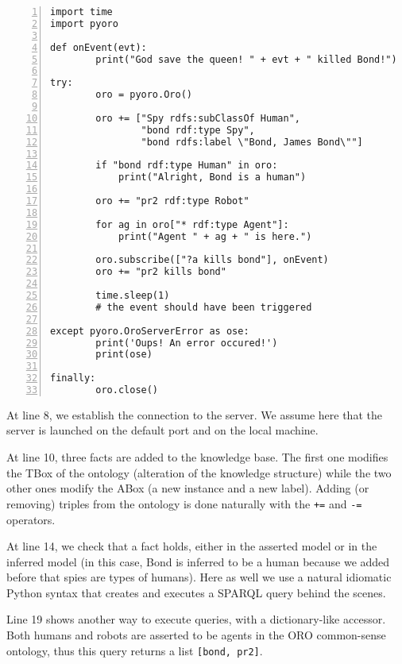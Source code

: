 \lstset{language=python}
\begin{lstlisting}[numbers=left,
                   caption=Example of interaction with {\tt oro-server} in Python, 
                   label = code|ex-python,
                   morekeywords={as}]
import time
import pyoro

def onEvent(evt):
        print("God save the queen! " + evt + " killed Bond!")

try:
        oro = pyoro.Oro()

        oro += ["Spy rdfs:subClassOf Human", 
                "bond rdf:type Spy", 
                "bond rdfs:label \"Bond, James Bond\""]

        if "bond rdf:type Human" in oro:
            print("Alright, Bond is a human")

        oro += "pr2 rdf:type Robot"

        for ag in oro["* rdf:type Agent"]:
            print("Agent " + ag + " is here.")

        oro.subscribe(["?a kills bond"], onEvent)
        oro += "pr2 kills bond"

        time.sleep(1)
        # the event should have been triggered

except pyoro.OroServerError as ose:
        print('Oups! An error occured!')
        print(ose)

finally:
        oro.close()
\end{lstlisting}

At line 8, we establish the connection to the server. We assume here that the
server is launched on the default port and on the local machine.

At line 10, three facts are added to the knowledge base. The first one modifies
the TBox of the ontology (alteration of the knowledge structure) while the two
other ones modify the ABox (a new instance and a new label). Adding (or
removing) triples from the ontology is done naturally with the {\tt +=} and
{\tt -=} operators.

At line 14, we check that a fact holds, either in the asserted model or in the
inferred model (in this case, Bond is inferred to be a human because we added
before that spies are types of humans). Here as well we use a natural idiomatic
Python syntax that creates and executes a SPARQL query behind the scenes.

Line 19 shows another way to execute queries, with a dictionary-like accessor.
Both humans and robots are asserted to be agents in the ORO common-sense
ontology, thus this query returns a list {\tt [bond, pr2]}.

